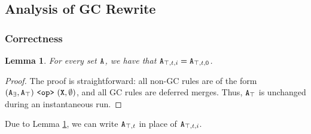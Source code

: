 \documentclass{article}
\numberwithin{equation}{section}
\newtheorem{lemma}[theorem]{Lemma}
\renewcommand{\tt}[1]{\ifmmode\text{\texttt{#1}}\else\texttt{#1}\fi}
\begin{document}
\subsection{Analysis of GC Rewrite}

\subsubsection{Correctness}
\label{sec:logical:analysis:correctness}

\begin{lemma}
\label{lem:unchangedexists}
For every set $\tt{A}$, we have that $\tt{A}_{\top,t,i} = \tt{A}_{\top,t,0}$.
\end{lemma}
\begin{proof}
The proof is straightforward: all non-GC rules are of the form $(\tt{A}_\exists, \tt{A}_\top) ~\tt{<op>}~ (\tt{X}, \emptyset)$, and all GC rules are deferred merges.
Thus, $\tt{A}_\top$ is unchanged during an instantaneous run.
\end{proof}
Due to Lemma \ref{lem:unchangedexists}, we can write $\tt{A}_{\top,t}$ in place of $\tt{A}_{\top,t,i}$.
\end{document}
